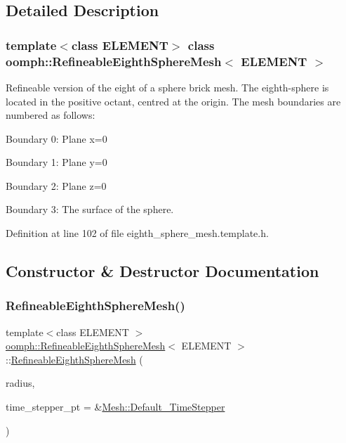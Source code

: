 \subsection{Detailed Description}
\subsubsection*{template$<$class E\+L\+E\+M\+E\+NT$>$\newline
class oomph\+::\+Refineable\+Eighth\+Sphere\+Mesh$<$ E\+L\+E\+M\+E\+N\+T $>$}

Refineable version of the eight of a sphere brick mesh. The eighth-\/sphere is located in the positive octant, centred at the origin. The mesh boundaries are numbered as follows\+:
\begin{DoxyItemize}
\item Boundary 0\+: Plane x=0
\item Boundary 1\+: Plane y=0
\item Boundary 2\+: Plane z=0
\item Boundary 3\+: The surface of the sphere. 
\end{DoxyItemize}

Definition at line 102 of file eighth\+\_\+sphere\+\_\+mesh.\+template.\+h.



\subsection{Constructor \& Destructor Documentation}
\mbox{\label{classoomph_1_1RefineableEighthSphereMesh_a975d12a45de7356f50bd69f3197659aa}} 
\subsubsection{\texorpdfstring{Refineable\+Eighth\+Sphere\+Mesh()}{RefineableEighthSphereMesh()}}
{\footnotesize\ttfamily template$<$class E\+L\+E\+M\+E\+NT $>$ \\
\hyperlink{classoomph_1_1RefineableEighthSphereMesh}{oomph\+::\+Refineable\+Eighth\+Sphere\+Mesh}$<$ E\+L\+E\+M\+E\+NT $>$\+::\hyperlink{classoomph_1_1RefineableEighthSphereMesh}{Refineable\+Eighth\+Sphere\+Mesh} (\begin{DoxyParamCaption}\item[{const double \&}]{radius,  }\item[{\hyperlink{classoomph_1_1TimeStepper}{Time\+Stepper} $\ast$}]{time\+\_\+stepper\+\_\+pt = {\ttfamily \&\hyperlink{classoomph_1_1Mesh_a12243d0fee2b1fcee729ee5a4777ea10}{Mesh\+::\+Default\+\_\+\+Time\+Stepper}} }\end{DoxyParamCaption})\hspace{0.3cm}{\ttfamily [inline]}}



